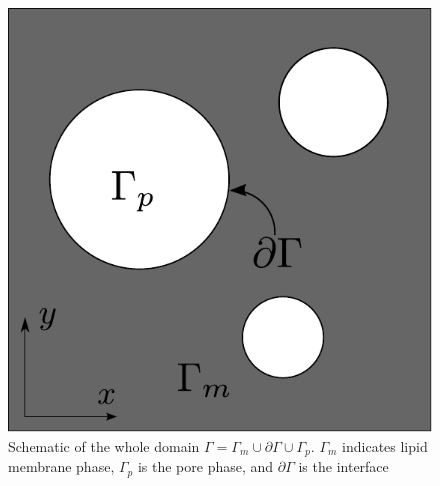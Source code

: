 \documentclass[english,12pt]{article}
\begin{document}
\begin{figure}[H]
	\centering
	\includegraphics[scale=0.5]{pics/model1_2.pdf}
	\caption{\footnotesize{Schematic of the whole domain $\Gamma = \Gamma_m \cup \partial\Gamma \cup \Gamma_p$. $\Gamma_m$ indicates lipid membrane phase, $\Gamma_p$ is the pore phase, and $\partial\Gamma$ is the interface }}
	\label{fig:model1}
\end{figure}
\end{document}
